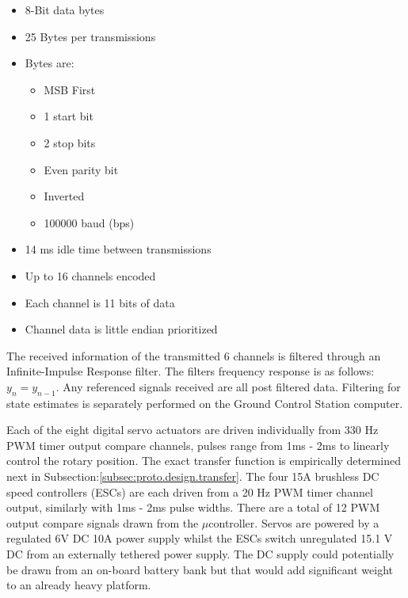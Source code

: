 \begin{itemize}
\item 8-Bit data bytes
\item 25 Bytes per transmissions
\item Bytes are:
\begin{itemize}
\item MSB First
\item 1 start bit
\item 2 stop bits
\item Even parity bit
\item Inverted
\item 100000 baud (bps)
\end{itemize}
\item 14 ms idle time between transmissions
\item Up to 16 channels encoded
\item Each channel is 11 bits of data
\item Channel data is little endian prioritized
\end{itemize}
{\color{red}
The received information of the transmitted 6 channels is filtered through an Infinite-Impulse Response filter. The filters frequency response is as follows: $
y_n = y_{n-1}$. Any referenced signals received are all post filtered data. Filtering for state estimates is separately performed on the Ground Control Station computer.}
\par
Each of the eight digital servo actuators are driven individually from 330 Hz PWM timer output compare channels, pulses range from 1ms - 2ms to linearly control the rotary position. The exact transfer function is empirically determined next in Subsection:\ref{subsec:proto.design.transfer}. The four 15A brushless DC speed controllers (ESCs) are each driven from a 20 Hz PWM timer channel output, similarly with 1ms - 2ms pulse widths. There are a total of 12 PWM output compare signals drawn from the $\mu$controller. Servos are powered by a regulated 6V DC 10A power supply \cite{rotorstar} whilst the ESCs switch unregulated 15.1 V DC from an externally tethered power supply. The DC supply could potentially be drawn from an on-board battery bank but that would add significant weight to an already heavy platform.
